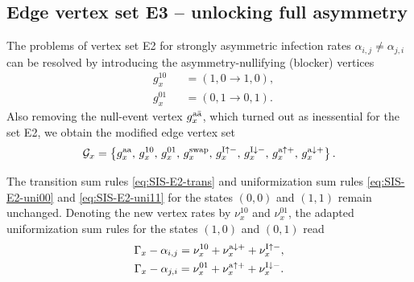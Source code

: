 \documentclass[english,10pt,aps,pra,twocolumn,superscriptaddress,floatfix,fleqn]{revtex4-2}
\newcommand{\mc}[1]{\mathcal{#1}}
\newcommand{\G} {\mc{G}}
\newcommand{\tI}{\textnormal{I}}
\newcommand{\ta}{\textnormal{a}}
\newcommand{\bta}{\bar{\textnormal{a}}}
\newcommand{\taa}{\textnormal{aa}}
\newcommand{\swap}{\textnormal{swap}}
\let\up\uparrow
\let\dw\downarrow
\begin{document}
\subsection{Edge vertex set \textsc{E3} -- unlocking full asymmetry}\label{sec:SIS-E3}
The problems of vertex set \textsc{E2} for strongly asymmetric infection rates $\alpha_{i,j}\neq\alpha_{j,i}$ can be resolved by introducing the asymmetry-nullifying (blocker) vertices
\begin{subequations}
\begin{alignat}{3}
	&g^{10}_x	&&=(1,0\to 1,0),\\
	&g^{01}_x	&&=(0,1\to 0,1).
\end{alignat}
\end{subequations}
Also removing the null-event vertex $g^{\ta\bta}_x$, which turned out as inessential for the set \textsc{E2}, we obtain the modified edge vertex set
\begin{equation}
	\G_x=\left\{g^\taa_x,\,g^{10}_x,\,g^{01}_x,\, g^\swap_x,\, g^{\tI\up-}_x,\, g^{\tI\dw-}_x,\, g^{\ta\up+}_x,\, g^{\ta\dw+}_x\right\}.
\end{equation}

The transition sum rules \eqref{eq:SIS-E2-trans} and uniformization sum rules \eqref{eq:SIS-E2-uni00} and \eqref{eq:SIS-E2-uni11} for the states $(0,0)$ and $(1,1)$ remain unchanged. Denoting the new vertex rates by $\nu^{10}_x$ and $\nu^{01}_x$, the adapted uniformization sum rules for the states $(1,0)$ and $(0,1)$ read
\begin{subequations}\label{eq:SIS-E3-uni10}
\begin{gather}
	\Gamma_x-\alpha_{i,j}=\nu^{10}_x+\nu^{\ta\dw+}_x+\nu^{\tI\up-}_x,\\
	\Gamma_x-\alpha_{j,i}=\nu^{01}_x+\nu^{\ta\up+}_x+\nu^{\tI\dw-}_x.
\end{gather}
\end{subequations}
\end{document}
